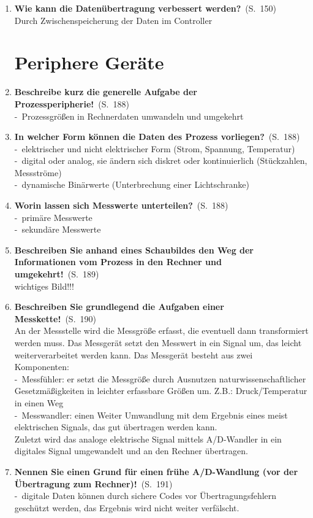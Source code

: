 \documentclass[a4paper,12pt]{article}
\newcommand{\question}[3]{\pagebreak[3]\item {\textbf{#1?}}\ (S.\ #2)#3}
\newcommand{\statement}[3]{\pagebreak[3]\item {\textbf{#1!}}\ (S.\ #2)#3}
\newcommand{\catchword}[1]{\\-\ #1}
\newcommand{\normaltext}[1]{\\#1}
\newcommand{\page}[1]{#1}
\begin{document}
\begin{enumerate}
  \question{Wie kann die Datenübertragung verbessert werden}{\page{150}}
  {
    \normaltext{Durch Zwischenspeicherung der Daten im Controller}
  }

  \newpage
  \section{Periphere Geräte}

  \statement{Beschreibe kurz die generelle Aufgabe der Prozessperipherie}{\page{188}}
  {
    \catchword{Prozessgrößen in Rechnerdaten umwandeln und umgekehrt}
  }

  \question{In welcher Form können die Daten des Prozess vorliegen}{\page{188}}
  {
    \catchword{elektrischer und nicht elektrischer Form (Strom, Spannung, Temperatur)}
    \catchword{digital oder analog, sie ändern sich diskret oder kontinuierlich (Stückzahlen, Messströme)}
    \catchword{dynamische Binärwerte (Unterbrechung einer Lichtschranke)}
  }

  \question{Worin lassen sich Messwerte unterteilen}{\page{188}}
  {
    \catchword{primäre Messwerte}
    \catchword{sekundäre Messwerte}
  }

  \statement{Beschreiben Sie anhand eines Schaubildes den Weg der Informationen
             vom Prozess in den Rechner und umgekehrt}{\page{189}}
  {
    \normaltext{wichtiges Bild!!!}
  }

  \statement{Beschreiben Sie grundlegend die Aufgaben einer Messkette}{\page{190}}
  {
    \normaltext{An der Messstelle wird die Messgröße erfasst, die eventuell dann 
               transformiert werden muss. Das Messgerät setzt den Messwert in ein Signal
               um, das leicht weiterverarbeitet werden kann. Das Messgerät besteht
               aus zwei Komponenten:}
    \catchword{Messfühler: er setzt die Messgröße durch Ausnutzen naturwissenschaftlicher
               Gesetzmäßigkeiten in leichter erfassbare Größen um. Z.B.: Druck/Temperatur in einen Weg} 
    \catchword{Messwandler: einen Weiter Umwandlung mit dem Ergebnis eines meist elektrischen
               Signals, das gut übertragen werden kann.}
    \normaltext{Zuletzt wird das analoge elektrische Signal mittels A/D-Wandler in ein digitales
                Signal umgewandelt und an den Rechner übertragen.}
  }

  \statement{Nennen Sie einen Grund für einen frühe A/D-Wandlung
             (vor der Übertragung zum Rechner)}{\page{191}}
  {
    \catchword{digitale Daten können durch sichere Codes vor Übertragungsfehlern geschützt werden,
               das Ergebnis wird nicht weiter verfälscht.} 
  }


\end{enumerate}
\end{document}
